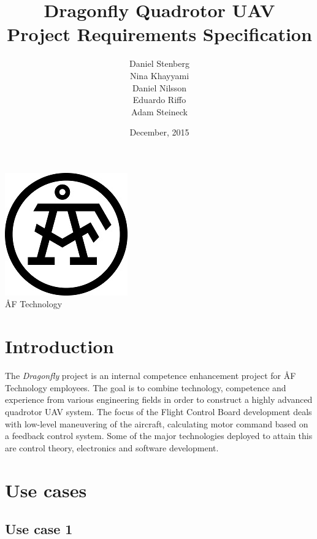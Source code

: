 \documentclass[a4paper]{article}
\title{Dragonfly Quadrotor UAV \\ Project Requirements Specification}
\author{Daniel Stenberg \\ Nina Khayyami \\ Daniel Nilsson \\ Eduardo Riffo \\ Adam Steineck}
\date{December, 2015}         		%
\begin{document}

\maketitle                      		%

\begin{center}
\vspace{64pt}
\includegraphics[scale=1.6]{images/AF_Logotype20141_Black.png}
\vspace{16pt}
\\ \large ÅF Technology
\end{center}

\newpage

\tableofcontents				%

\newpage

\section{Introduction}

The \emph{Dragonfly} project is an internal competence enhancement project for ÅF Technology employees. The goal is to combine technology, competence and experience from various engineering fields in order to construct a highly advanced quadrotor UAV system. The focus of the Flight Control Board development deals with low-level maneuvering of the aircraft, calculating motor command based on a feedback control system. Some of the major technologies deployed to attain this are control theory, electronics and software development.

\section{Use cases}

\subsection{Use case 1}
\end{document}
